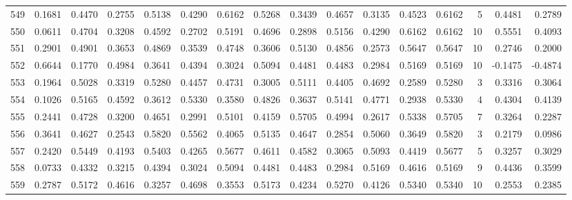 \begin{tabular}{lrrrrrrrrrrrrrrr}
549 &      0.1681 &  0.4470 &  0.2755 &  0.5138 &  0.4290 &  0.6162 &  0.5268 &  0.3439 &  0.4657 &  0.3135 &   0.4523 &     0.6162 &      5 &                    0.4481 &                     0.2789 \\
550 &      0.0611 &  0.4704 &  0.3208 &  0.4592 &  0.2702 &  0.5191 &  0.4696 &  0.2898 &  0.5156 &  0.4290 &   0.6162 &     0.6162 &     10 &                    0.5551 &                     0.4093 \\
551 &      0.2901 &  0.4901 &  0.3653 &  0.4869 &  0.3539 &  0.4748 &  0.3606 &  0.5130 &  0.4856 &  0.2573 &   0.5647 &     0.5647 &     10 &                    0.2746 &                     0.2000 \\
552 &      0.6644 &  0.1770 &  0.4984 &  0.3641 &  0.4394 &  0.3024 &  0.5094 &  0.4481 &  0.4483 &  0.2984 &   0.5169 &     0.5169 &     10 &                   -0.1475 &                    -0.4874 \\
553 &      0.1964 &  0.5028 &  0.3319 &  0.5280 &  0.4457 &  0.4731 &  0.3005 &  0.5111 &  0.4405 &  0.4692 &   0.2589 &     0.5280 &      3 &                    0.3316 &                     0.3064 \\
554 &      0.1026 &  0.5165 &  0.4592 &  0.3612 &  0.5330 &  0.3580 &  0.4826 &  0.3637 &  0.5141 &  0.4771 &   0.2938 &     0.5330 &      4 &                    0.4304 &                     0.4139 \\
555 &      0.2441 &  0.4728 &  0.3200 &  0.4651 &  0.2991 &  0.5101 &  0.4159 &  0.5705 &  0.4994 &  0.2617 &   0.5338 &     0.5705 &      7 &                    0.3264 &                     0.2287 \\
556 &      0.3641 &  0.4627 &  0.2543 &  0.5820 &  0.5562 &  0.4065 &  0.5135 &  0.4647 &  0.2854 &  0.5060 &   0.3649 &     0.5820 &      3 &                    0.2179 &                     0.0986 \\
557 &      0.2420 &  0.5449 &  0.4193 &  0.5403 &  0.4265 &  0.5677 &  0.4611 &  0.4582 &  0.3065 &  0.5093 &   0.4419 &     0.5677 &      5 &                    0.3257 &                     0.3029 \\
558 &      0.0733 &  0.4332 &  0.3215 &  0.4394 &  0.3024 &  0.5094 &  0.4481 &  0.4483 &  0.2984 &  0.5169 &   0.4616 &     0.5169 &      9 &                    0.4436 &                     0.3599 \\
559 &      0.2787 &  0.5172 &  0.4616 &  0.3257 &  0.4698 &  0.3553 &  0.5173 &  0.4234 &  0.5270 &  0.4126 &   0.5340 &     0.5340 &     10 &                    0.2553 &                     0.2385 \\

\end{tabular}
